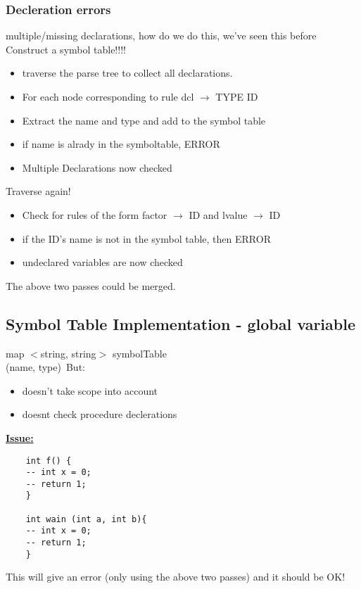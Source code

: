 \documentclass[12pt]{article}
\newcommand{\myt}[1]{\textbf{\underline{#1}}}
\begin{document}
	\subsubsection*{Decleration errors}
	multiple/missing declarations, how do we do this, we've seen this before\\
	Construct a symbol table!!!!\\
	\begin{itemize}
		\item traverse the parse tree to collect all declarations.
		\item For each node corresponding to rule dcl $\rightarrow$ TYPE ID
		\item Extract the name and type and add to the symbol table
		\item if name is alrady in the symboltable, ERROR
		\item Multiple Declarations now checked
	\end{itemize}
	
	Traverse again!\\
	\begin{itemize}
		\item Check for rules of the form factor $\rightarrow$ ID and lvalue $\rightarrow$ ID\\
		\item if the ID's name is not in the symbol table, then ERROR
		\item undeclared variables are now checked
	\end{itemize}
	
	The above two passes could be merged.\\
	
	\subsection*{Symbol Table Implementation - global variable}
	map $<$string, string$>$ symbolTable\\
	(name, type)\
	But:\\
	\begin{itemize}
		\item doesn't take scope into account
		\item doesnt check procedure declerations
	\end{itemize}
	
	\myt{Issue:}\\
	\begin{verbatim}
	int f() {
	-- int x = 0;
	-- return 1;
	}
	
	int wain (int a, int b){
	-- int x = 0;
	-- return 1;
	}
	\end{verbatim}
	This will give an error (only using the above two passes) and it should be OK!\\
	
\end{document}
